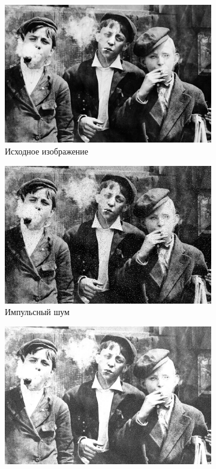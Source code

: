 \begin{figure}[ht!] 
  \centering
  \begin{subfigure}[b]{0.5\linewidth}
      \centering
      \includegraphics[width=0.95\linewidth]{../lewis-hine-taschen-main-3.jpg} 
      \caption{Исходное изображение} 
      \vspace{4ex}
  \end{subfigure}%
  \begin{subfigure}[b]{0.5\linewidth}
    \centering
    \includegraphics[width=0.95\linewidth]{../Adaptive_Median_Filter/Adaptive_Median_Impulse_noise_k=7.jpg} 
    \caption{Импульсный шум} 
    \vspace{4ex}
  \end{subfigure}
  \begin{subfigure}[b]{0.5\linewidth}
    \centering
    \includegraphics[width=0.95\linewidth]{../Adaptive_Median_Filter/Adaptive_Median_Additive_noise_k=7.jpg} 

\end{subfigure}
\end{figure}

